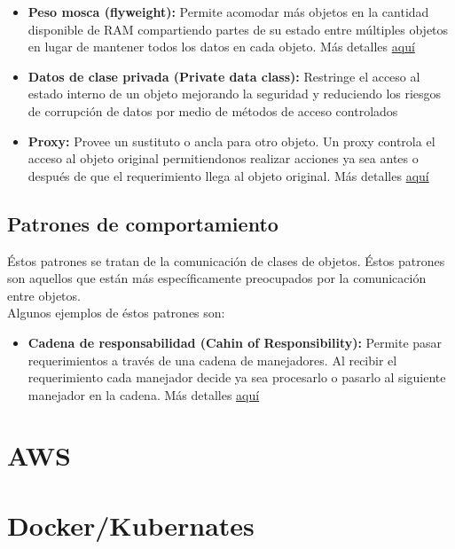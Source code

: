 \documentclass[12pt,article,oneside]{memoir}
\begin{document}
\begin{itemize}
			\item \textbf{Peso mosca (flyweight):} Permite acomodar m\'as objetos en la cantidad disponible de RAM 
			compartiendo partes de su estado entre m\'ultiples objetos en lugar de mantener todos los datos en cada 
			objeto. M\'as detalles \href{https://refactoring.guru/design-patterns/flyweight}{aqu\'i}
			
			\item \textbf{Datos de clase privada (Private data class):} Restringe el acceso al estado interno de un objeto
			mejorando la seguridad y reduciendo los riesgos de corrupci\'on de datos por medio de m\'etodos de acceso 
			controlados
			
			\item \textbf{Proxy:} Provee un sustituto o ancla para otro objeto. Un proxy controla el acceso al objeto 
			original permitiendonos realizar acciones ya sea antes o despu\'es de que el requerimiento llega al objeto 
			original. M\'as detalles \href{https://refactoring.guru/design-patterns/proxy}{aqu\'i}
		\end{itemize}
		\newpage
	
		\section{Patrones de comportamiento}
		\'Estos patrones se tratan de la comunicaci\'on de clases de objetos. \'Estos patrones son aquellos que est\'an
		m\'as espec\'ificamente preocupados por la comunicaci\'on entre objetos.\\
		
		Algunos ejemplos de \'estos patrones son:
		
		\begin{itemize}
			\item \textbf{Cadena de responsabilidad (Cahin of Responsibility):} Permite pasar requerimientos a trav\'es de 
			una cadena de manejadores. Al recibir el requerimiento cada manejador decide ya sea procesarlo o pasarlo al 
			siguiente manejador en la cadena. 
			M\'as detalles \href{https://refactoring.guru/design-patterns/chain-of-responsibility}{aqu\'i}
		\end{itemize}
		\newpage
		
	\chapter{AWS}
	\newpage
	
	\chapter{Docker/Kubernates}
	
\end{document}
